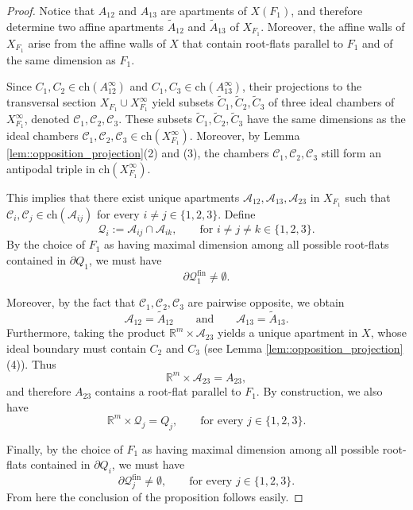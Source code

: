 \documentclass[11pt]{amsart}
\newcommand{\Ch}{\mathrm{ch}}
\theoremstyle{plain}
\theoremstyle{definition}
\theoremstyle{remark}
\begin{document}
\begin{proof}
		Notice that $A_{12}$ and $A_{13}$ are apartments of $X(F_1)$, and therefore determine two affine apartments $\widetilde{A}_{12}$ and $\widetilde{A}_{13}$ of $X_{F_1}$. Moreover, the affine walls of $X_{F_1}$ arise from the affine walls of $X$ that contain root-flats parallel to $F_1$ and of the same dimension as $F_1$.
		
		Since $C_1, C_2 \in \Ch(A_{12}^{\infty})$ and $C_1, C_3 \in \Ch(A_{13}^{\infty})$, their projections to the transversal section $X_{F_1} \cup X_{F_1}^{\infty}$ yield subsets $\widetilde{C}_1, \widetilde{C}_2, \widetilde{C}_3$ of three ideal chambers of $X_{F_1}^{\infty}$, denoted $\mathcal{C}_1, \mathcal{C}_2, \mathcal{C}_3$. These subsets $\widetilde{C}_1, \widetilde{C}_2, \widetilde{C}_3$ have the same dimensions as the ideal chambers  $\mathcal{C}_1, \mathcal{C}_2, \mathcal{C}_3 \in \Ch(X_{F_1}^{\infty})$. Moreover, by Lemma \ref{lem::opposition_projection}(2) and (3), the chambers 
		$\mathcal{C}_1, \mathcal{C}_2, \mathcal{C}_3$ still form an antipodal triple in $ \Ch(X_{F_1}^{\infty})$.
		
		This implies that there exist unique apartments $\mathcal{A}_{12}, \mathcal{A}_{13}, \mathcal{A}_{23}$ in $X_{F_1}$ such that 
		$\mathcal{C}_i, \mathcal{C}_j \in \Ch(\mathcal{A}_{ij})$ for every $i \neq j \in \{1,2,3\}$. Define
		\[
		\mathcal{Q}_i := \mathcal{A}_{ij} \cap \mathcal{A}_{ik},
		\qquad \text{for } i \neq j \neq k \in \{1,2,3\}.
		\]
		By the choice of $F_1$ as having maximal dimension among all possible root-flats contained in $\partial Q_1$, we must have
		\[
		\partial \mathcal{Q}_1^{\mathrm{fin}} \neq \emptyset.
		\]
		
		Moreover, by the fact that $\mathcal{C}_1, \mathcal{C}_2, \mathcal{C}_3$ are pairwise opposite, we obtain
		\[
		\mathcal{A}_{12} = \widetilde{A}_{12} \qquad \text{and} \qquad 
		\mathcal{A}_{13} = \widetilde{A}_{13}.
		\]
		Furthermore, taking the product $\mathbb{R}^m \times \mathcal{A}_{23}$ yields a unique apartment in $X$, whose ideal boundary must contain $C_2$ and $C_3$ (see Lemma \ref{lem::opposition_projection}(4)). Thus
		\[
		\mathbb{R}^m \times \mathcal{A}_{23} = A_{23},
		\]
		and therefore $A_{23}$ contains a root-flat parallel to $F_1$. By construction, we also have
		\[
		\mathbb{R}^m \times \mathcal{Q}_j = Q_j, 
		\qquad \text{for every } j \in \{1,2,3\}.
		\]
		
		Finally, by the choice of $F_1$ as having maximal dimension among all possible root-flats contained in $\partial Q_i$, we must have
		\[
		\partial \mathcal{Q}_j^{\mathrm{fin}} \neq \emptyset,
		\qquad \text{for every } j \in \{1,2,3\}.
		\]
		From here the conclusion of the proposition follows easily.
	\end{proof}
	
\end{document}
